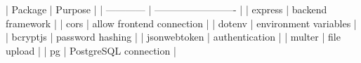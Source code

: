 | Package      | Purpose                   |
| ------------ | ------------------------- |
| express      | backend framework         |
| cors         | allow frontend connection |
| dotenv       | environment variables     |
| bcryptjs     | password hashing          |
| jsonwebtoken | authentication            |
| multer       | file upload               |
| pg           | PostgreSQL connection     |

